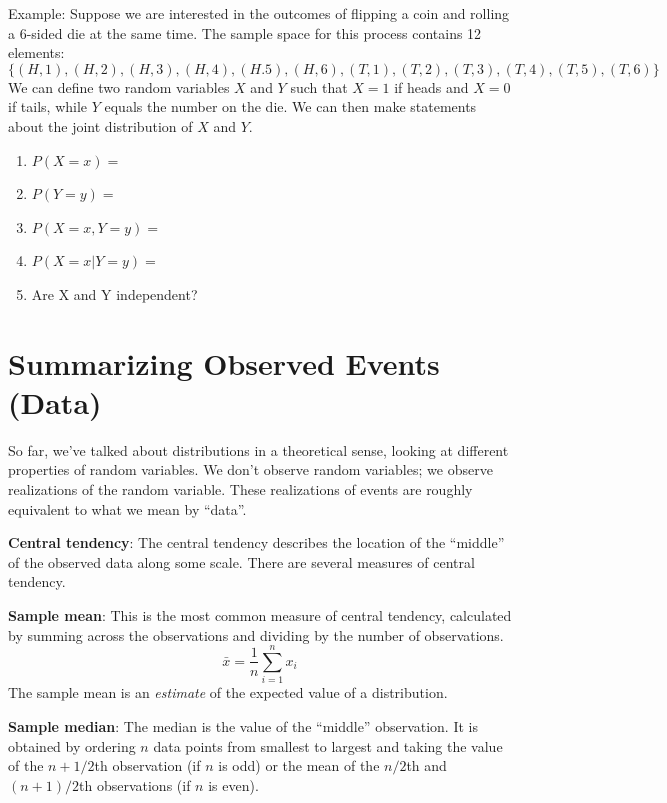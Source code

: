 \documentclass[]{book}
\theoremstyle{definition}
\theoremstyle{definition}
\theoremstyle{definition}
\theoremstyle{remark}
\begin{document}
\begin{framed}

Example:  Suppose we are interested in the outcomes of flipping a coin and rolling a 6-sided die at the same time.  The sample space for this process contains 12 elements: $$\{(H, 1), (H, 2), (H, 3), (H, 4), (H. 5), (H, 6), (T, 1), (T, 2), (T, 3), (T, 4), (T, 5), (T, 6)\}$$  We can define two random variables $X$ and $Y$ such that $X = 1$ if heads and $X = 0$ if tails, while $Y$ equals the number on the die.  We can then make statements about the joint distribution of $X$ and $Y$.

\begin{enumerate}
\item $P(X=x) =$
\item $P(Y=y) =$
\item $P(X=x, Y=y) = $
\item $P(X=x|Y=y) = $
\item Are X and Y independent? 
\end{enumerate}

\end{framed}

\section{Summarizing Observed Events
(Data)}\label{summarizing-observed-events-data}

So far, we've talked about distributions in a theoretical sense, looking
at different properties of random variables. We don't observe random
variables; we observe realizations of the random variable. These
realizations of events are roughly equivalent to what we mean by
``data''.

\textbf{Central tendency}: The central tendency describes the location
of the ``middle'' of the observed data along some scale. There are
several measures of central tendency.

\textbf{Sample mean}: This is the most common measure of central
tendency, calculated by summing across the observations and dividing by
the number of observations. \[\bar{x} = \frac{1}{n}\sum_{i=1}^{n}x_i\]
The sample mean is an \textit{estimate} of the expected value of a
distribution.

\textbf{Sample median}: The median is the value of the ``middle''
observation. It is obtained by ordering \(n\) data points from smallest
to largest and taking the value of the \(n+1/2\)th observation (if \(n\)
is odd) or the mean of the \(n/2\)th and \((n+1)/2\)th observations (if
\(n\) is even).
\end{document}
